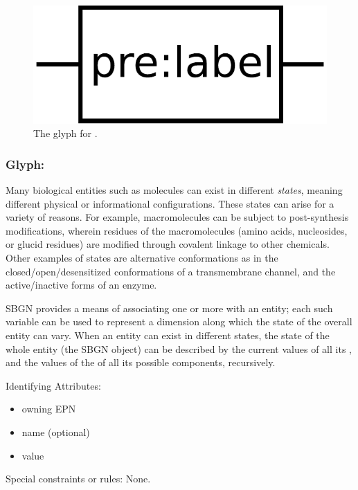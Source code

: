 \begin{figure}[H]
  \centering
  \includegraphics[scale = 0.3]{images/unitInformation}
  \caption{The \PD glyph for .}
  \label{fig:unitInfo}
\end{figure}


\subsubsection{Glyph: }
\label{sec:stateVariable}

Many biological entities such as molecules can exist in different \emph{states}, meaning different physical or informational configurations.  These states can arise for a variety of reasons.  For example, macromolecules can be subject to post-synthesis modifications, wherein residues of the macromolecules (amino acids, nucleosides, or glucid residues) are modified through covalent linkage to other chemicals.  Other examples of states are alternative conformations as in the closed/open/desensitized conformations of a transmembrane channel, and the active/inactive forms of an enzyme.

SBGN provides a means of associating one or more  with an entity; each such variable can be used to represent a dimension along which the state of the overall entity can vary.  When an entity can exist in different states, the state of the whole entity (\ie the SBGN object) can be described by the current values of all its , and the values of the  of all its possible components, recursively.

\begin{glyphDescription}
\item[Identifying Attributes:]\mbox{}
  \begin{itemize}
  \item owning EPN
  \item name (optional)
  \item value
 \end{itemize}
\item[Special constraints or rules:]\mbox{}\newline None.
\end{glyphDescription}

